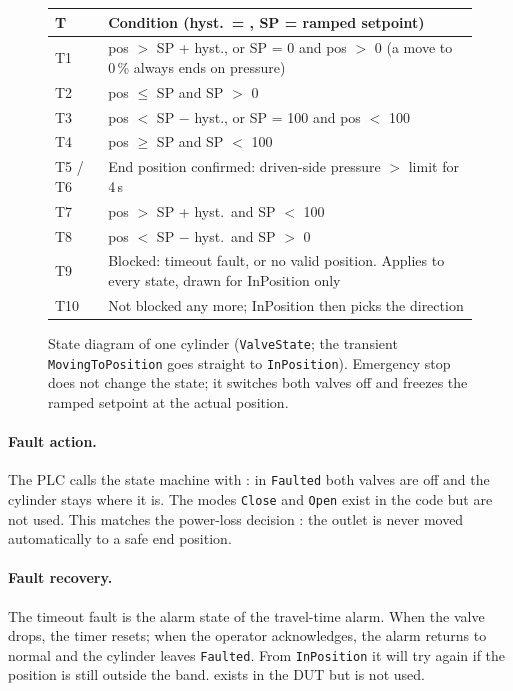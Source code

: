 \documentclass[11pt,a4paper]{article}
\begin{document}
\begin{figure}[htbp]
\vspace{2mm}
\begin{small}
\begin{tabularx}{\linewidth}{@{}lL@{}}
\toprule
T & Condition (hyst.\ = , SP = ramped setpoint) \\
\midrule
T1 & pos $>$ SP + hyst., or SP = 0 and pos $>$ 0 (a move to 0\,\% always ends on pressure) \\
T2 & pos $\le$ SP and SP $>$ 0 \\
T3 & pos $<$ SP $-$ hyst., or SP = 100 and pos $<$ 100 \\
T4 & pos $\ge$ SP and SP $<$ 100 \\
T5 / T6 & End position confirmed: driven-side pressure $>$ limit for 4\,s \\
T7 & pos $>$ SP + hyst.\ and SP $<$ 100 \\
T8 & pos $<$ SP $-$ hyst.\ and SP $>$ 0 \\
T9 & Blocked: timeout fault, or no valid position. Applies to every state, drawn for InPosition only \\
T10 & Not blocked any more; InPosition then picks the direction \\
\bottomrule
\end{tabularx}
\end{small}
\caption{State diagram of one cylinder (\texttt{ValveState}; the transient \texttt{MovingToPosition}
goes straight to \texttt{InPosition}). Emergency stop does not change the state; it switches both
valves off and freezes the ramped setpoint at the actual position.}
\label{fig:state}
\end{figure}

\paragraph{Fault action.} The PLC calls the state machine with : in
\texttt{Faulted} both valves are off and the cylinder stays where it is. The modes \texttt{Close}
and \texttt{Open} exist in the code but are not used. This matches the power-loss decision
: the outlet is never moved automatically to a safe end position.

\paragraph{Fault recovery.} The timeout fault is the alarm state of the travel-time alarm. When the
valve drops, the timer resets; when the operator acknowledges, the alarm returns to normal and the
cylinder leaves \texttt{Faulted}. From \texttt{InPosition} it will try again if the position is
still outside the band.  exists in the DUT but is not used.
\end{document}
